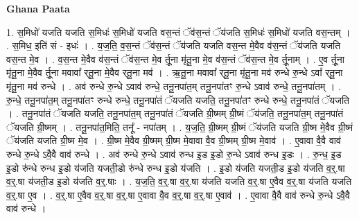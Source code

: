 \documentclass[17pt]{extarticle}
\begin{document}
\textbf{Ghana Paata } \newline

1. स॒मिधो॑ यजति यजति स॒मिधः॑ स॒मिधो॑ यजति वस॒न्तं ॅव॑स॒न्तं ॅय॑जति स॒मिधः॑ स॒मिधो॑ यजति वस॒न्तम् । . स॒मिध॒ इति॑ सं - इधः॑ । . य॒ज॒ति॒ व॒स॒न्तं ॅव॑स॒न्तं ॅय॑जति यजति वस॒न्त मे॒वैव व॑स॒न्तं ॅय॑जति यजति वस॒न्त मे॒व । . व॒स॒न्त मे॒वैव व॑स॒न्तं ॅव॑स॒न्त मे॒व र्तू॒ना मृ॑तू॒ना मे॒व व॑स॒न्तं ॅव॑स॒न्त मे॒व र्तू॒नाम् । . ए॒व र्तू॒ना मृ॑तू॒ना मे॒वैव र्तू॒ना मवावा᳚ र्‌तू॒ना मे॒वैव र्‌तू॒ना मव॑ । . ऋ॒तू॒ना मवावा᳚ र्‌तू॒ना मृ॑तू॒ना मव॑ रुन्धे रु॒न्धे ऽवा᳚ र्‌तू॒ना मृ॑तू॒ना मव॑ रुन्धे । . अव॑ रुन्धे रु॒न्धे ऽवाव॑ रुन्धे॒ तनू॒नपा॑त॒म् तनू॒नपा॑तꣳ रु॒न्धे ऽवाव॑ रुन्धे॒ तनू॒नपा॑तम् । . रु॒न्धे॒ तनू॒नपा॑त॒म् तनू॒नपा॑तꣳ रुन्धे रुन्धे॒ तनू॒नपा॑तं ॅयजति यजति॒ तनू॒नपा॑तꣳ रुन्धे रुन्धे॒ तनू॒नपा॑तं ॅयजति । . तनू॒नपा॑तं ॅयजति यजति॒ तनू॒नपा॑त॒म् तनू॒नपा॑तं ॅयजति ग्री॒ष्मम् ग्री॒ष्मं ॅय॑जति॒ तनू॒नपा॑त॒म् तनू॒नपा॑तं ॅयजति ग्री॒ष्मम् । . तनू॒नपा॑त॒मिति॒ तनू᳚ - नपा॑तम् । . य॒ज॒ति॒ ग्री॒ष्मम् ग्री॒ष्मं ॅय॑जति यजति ग्री॒ष्म मे॒वैव ग्री॒ष्मं ॅय॑जति यजति ग्री॒ष्म मे॒व । . ग्री॒ष्म मे॒वैव ग्री॒ष्मम् ग्री॒ष्म मे॒वावा वै॒व ग्री॒ष्मम् ग्री॒ष्म मे॒वाव॑ । . ए॒वावा वै॒वै वाव॑ रुन्धे रु॒न्धे ऽवै॒वै वाव॑ रुन्धे । . अव॑ रुन्धे रु॒न्धे ऽवाव॑ रुन्ध इ॒ड इ॒डो रु॒न्धे ऽवाव॑ रुन्ध इ॒डः । . रु॒न्ध॒ इ॒ड इ॒डो रु॑न्धे रुन्ध इ॒डो य॑जति यजती॒डो रु॑न्धे रुन्ध इ॒डो य॑जति । . इ॒डो य॑जति यजती॒ड इ॒डो य॑जति व॒र्॒.षा व॒र्॒.षा य॑जती॒ड इ॒डो य॑जति व॒र्॒.षाः । . य॒ज॒ति॒ व॒र्॒.षा व॒र्॒.षा य॑जति यजति व॒र्॒.षा ए॒वैव व॒र्॒.षा य॑जति यजति व॒र्॒.षा ए॒व । . व॒र्॒.षा ए॒वैव व॒र्॒.षा व॒र्॒.षा ए॒वावा वै॒व व॒र्॒.षा व॒र्॒.षा ए॒वाव॑ । . ए॒वावा वै॒वै वाव॑ रुन्धे रु॒न्धे ऽवै॒वै वाव॑ रुन्धे । \newline
\end{document}
